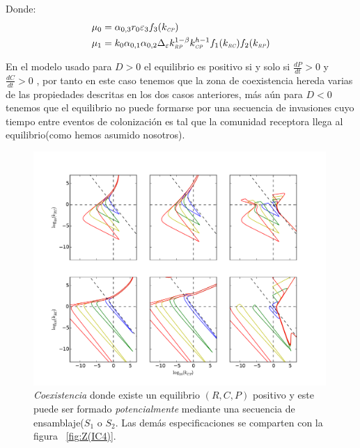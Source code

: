 Donde:
\begin{equation}
  \begin{aligned}
    \mu_0 &= \alpha_{0,3}r_0 \varepsilon_3 f_3(k_{\textit{\tiny CP}}) \\
    \mu_1 &= k_0 \alpha_{0,1}\alpha_{0,2} \Delta_\varepsilon k_{\textit{\tiny RP}}^{1-\beta} k_{\textit{\tiny CP}}^{h-1} f_1(k_{\textit{\tiny RC}})f_2(k_{\textit{\tiny RP}})
  \end{aligned}
\end{equation}

En el modelo usado para $D>0$ el equilibrio es positivo si y solo si $\frac{dP}{dt} >0 $ y $\frac{dC}{dt} >0$ , por tanto en este caso tenemos que la zona de coexistencia hereda varias de las propiedades descritas en los dos casos anteriores, m\'as a\'un para $D <0$ tenemos que el equilibrio no puede formarse por una secuencia de invasiones cuyo tiempo entre eventos de colonizaci\'on es tal que la comunidad receptora  llega al equilibrio(como hemos asumido nosotros).



\begin{figure}
  \centering
  \includegraphics[width = 0.99\textwidth]{./Plots/CoexistenceAcGrGr.pdf}
  \caption[Env $Coexistencia$]{\emph{Coexistencia} donde existe un equilibrio $(R,C,P)$ positivo y este puede ser formado \emph{potencialmente} mediante una secuencia de ensamblaje($S_1$ o $S_2$. Las dem\'as especificaciones se comparten con la figura ~\ref{fig:Z(IC4)}.}
  \label{fig:PSCoexistence}
\end{figure}


